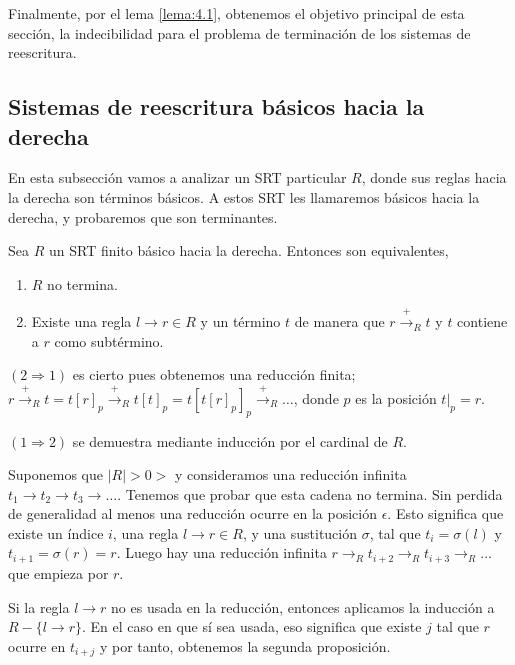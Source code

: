 Finalmente, por el lema \ref{lema:4.1}, obtenemos el objetivo principal
de esta sección, la indecibilidad para el problema de terminación de
los sistemas de reescritura.


\subsection{Sistemas de reescritura básicos hacia la derecha}

En esta subsección vamos a analizar un SRT particular $R$, donde sus
reglas hacia la derecha son términos básicos. A estos SRT les
llamaremos básicos hacia la derecha, y probaremos que son terminantes.

\begin{lema}
  Sea $R$ un SRT finito básico hacia la derecha. Entonces son
  equivalentes,
  \begin{enumerate}
  \item $R$ no termina.
  \item Existe una regla $l \rightarrow r \in R$ y un término $t$ de
    manera que $r \xrightarrow{+}_R t$ y $t$ contiene a $r$ como
    subtérmino.
  \end{enumerate}
\end{lema}

\begin{demo}
  $(2 \Rightarrow 1)$ es cierto pues obtenemos una reducción finita;
  $r\xrightarrow{+}_R t = t[r]_p \xrightarrow{+}_R t[t]_p =
  t[t[r]_p]_p \xrightarrow{+}_R \dots$, donde $p$ es la posición $t|_p = r$.
  
  $(1 \Rightarrow 2)$ se demuestra mediante inducción por el cardinal
  de $R$.

  Suponemos que $|R| >0>$ y consideramos una reducción infinita
  $t_1 \rightarrow t_2 \rightarrow t_3 \rightarrow \dots$. Tenemos que
  probar que esta cadena no termina. Sin perdida de generalidad al
  menos una reducción ocurre en la posición $\epsilon$. Esto significa
  que existe un índice $i$, una regla $l \rightarrow r \in R$, y una
  sustitución $\sigma$, tal que $t_i = \sigma(l)$ y
  $t_{i+1} = \sigma(r) = r$. Luego hay una reducción infinita
  $r \rightarrow_R t_{i+2} \rightarrow_R t_{i+3} \rightarrow_R \dots$
  que empieza por $r$.

  Si la regla $l \rightarrow r$ no es usada en la reducción, entonces
  aplicamos la inducción a $R - \{l \rightarrow r\}$. En el caso en
que sí sea usada, eso significa que existe $j$ tal que $r$ ocurre en
$t_{i+j}$ y por tanto, obtenemos la segunda proposición.
\end{demo}

